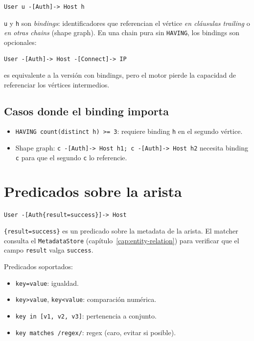 \begin{lstlisting}
User u -[Auth]-> Host h
\end{lstlisting}

\noindent
\texttt{u} y \texttt{h} son \emph{bindings}: identificadores que
referencian el vértice \emph{en cláusulas trailing} o \emph{en
otras chains} (shape graph). En una chain pura sin \texttt{HAVING},
los bindings son opcionales:

\begin{lstlisting}
User -[Auth]-> Host -[Connect]-> IP
\end{lstlisting}

\noindent
es equivalente a la versión con bindings, pero el motor pierde la
capacidad de referenciar los vértices intermedios.

\subsection{Casos donde el binding importa}

\begin{itemize}
    \item \texttt{HAVING count(distinct h) >= 3}: requiere binding
    \texttt{h} en el segundo vértice.
    \item Shape graph: \texttt{c -[Auth]-> Host h1; c -[Auth]-> Host h2}
    necesita binding \texttt{c} para que el segundo \texttt{c} lo
    referencie.
\end{itemize}

\section{Predicados sobre la arista}

\begin{lstlisting}
User -[Auth{result=success}]-> Host
\end{lstlisting}

\noindent
\texttt{\{result=success\}} es un predicado sobre la metadata de
la arista. El matcher consulta el \texttt{MetadataStore}
(capítulo~\ref{cap:entity-relation}) para verificar que el campo
\texttt{result} valga \texttt{success}.

Predicados soportados:

\begin{itemize}
    \item \texttt{key=value}: igualdad.
    \item \texttt{key>value}, \texttt{key<value}: comparación
    numérica.
    \item \texttt{key in [v1, v2, v3]}: pertenencia a conjunto.
    \item \texttt{key matches /regex/}: regex (caro, evitar si
    posible).
\end{itemize}

